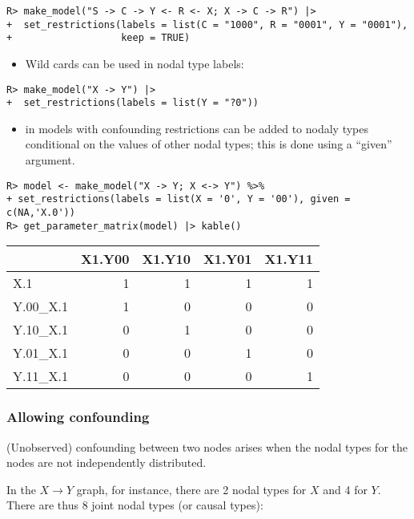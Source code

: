 \documentclass[
  11pt,
  article]{jss}
\providecommand{\tightlist}{%
  \setlength{\itemsep}{0pt}\setlength{\parskip}{0pt}}\usepackage{longtable,booktabs,array}
\begin{document}
\begin{verbatim}
R> make_model("S -> C -> Y <- R <- X; X -> C -> R") |>
+  set_restrictions(labels = list(C = "1000", R = "0001", Y = "0001"), 
+                   keep = TRUE)
\end{verbatim}

\begin{itemize}
\tightlist
\item
  Wild cards can be used in nodal type labels:
\end{itemize}

\begin{verbatim}
R> make_model("X -> Y") |>
+  set_restrictions(labels = list(Y = "?0"))
\end{verbatim}

\begin{itemize}
\tightlist
\item
  in models with confounding restrictions can be added to nodaly types
  conditional on the values of other nodal types; this is done using a
  ``given'' argument.
\end{itemize}

\begin{verbatim}
R> model <- make_model("X -> Y; X <-> Y") %>%
+ set_restrictions(labels = list(X = '0', Y = '00'), given = c(NA,'X.0'))
R> get_parameter_matrix(model) |> kable()
\end{verbatim}

\begin{tabular}{l|r|r|r|r}
\hline
  & X1.Y00 & X1.Y10 & X1.Y01 & X1.Y11\\
\hline
X.1 & 1 & 1 & 1 & 1\\
\hline
Y.00\_X.1 & 1 & 0 & 0 & 0\\
\hline
Y.10\_X.1 & 0 & 1 & 0 & 0\\
\hline
Y.01\_X.1 & 0 & 0 & 1 & 0\\
\hline
Y.11\_X.1 & 0 & 0 & 0 & 1\\
\hline
\end{tabular}

\hypertarget{sec-confounding}{%
\subsubsection{Allowing confounding}\label{sec-confounding}}

(Unobserved) confounding between two nodes arises when the nodal types
for the nodes are not independently distributed.

In the \(X \rightarrow Y\) graph, for instance, there are 2 nodal types
for \(X\) and 4 for \(Y\). There are thus 8 joint nodal types (or causal
types):
\end{document}
